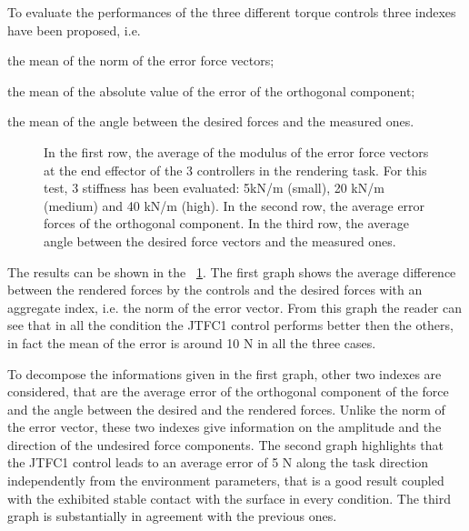 \par To evaluate the performances of the three different torque controls three indexes have been proposed, i.e. 

\setlength{\IEEEiednormlabelsep}{0.7 cm}
\begin{IEEEitemize}
	\item the mean of the norm of the error force vectors;
	\item the mean of the absolute value of the error of the orthogonal component;
	\item the mean of the angle between the desired forces and the measured ones.
\end{IEEEitemize}

\begin{figure}[htb]
	\centering
	\def\svgwidth{1\columnwidth}
	\begin{footnotesize}
		
	\end{footnotesize}
	\caption{In the first row, the average of the modulus of the error force vectors at the end effector of the 3 controllers in the rendering task. For this test, 3 stiffness has been evaluated: 5kN/m (small), 20 kN/m (medium) and 40 kN/m (high). In the second row, the average error forces of the orthogonal component. In the third row, the average angle between the desired force vectors and the measured ones.}
	\label{fig:renderingErrors}
\end{figure}

\par The results can be shown in the \figurename \ \ref{fig:renderingErrors}. The first graph shows the average difference between the rendered forces by the controls and the desired forces with an aggregate index, i.e. the norm of the error vector. From this graph the reader can see that in all the condition the JTFC1 control performs better then the others, in fact the mean of the error is around 10 N in all the three cases.
\par To decompose the informations given in the first graph, other two indexes are considered, that are the average error of the orthogonal component of the force and the angle between the desired and the rendered forces. Unlike the norm of the error vector, these two indexes give information on the amplitude and the direction of the undesired force components. The second graph highlights that the JTFC1 control leads to an average error of 5 N along the task direction independently from the environment parameters, that is a good result coupled with the exhibited stable contact with the surface in every condition.
The third graph is substantially in agreement with the previous ones.